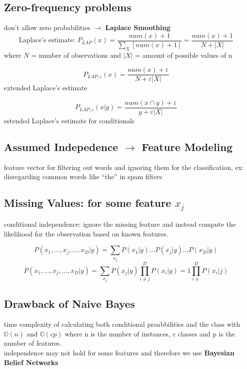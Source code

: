\documentclass{article}
\begin{document}
\subsection*{Zero-frequency problems}
don't allow zero probabilities $\rightarrow$ \textbf{Laplace Smoothing}
\\
\begin{equation}
    \text{Laplace's estimate: } P_{LAP}(x) = \frac{num(x) + 1}{\sum_{X}[num(x)+1]} = \frac{num(x) + 1}{N + |X|}
\end{equation}
where $N$ = number of observations and $|X|$ = amount of possible values of n

\begin{equation}
    P_{LAP, \varepsilon}(x) = \frac{num(x) + \varepsilon}{N + \varepsilon|X|}
\end{equation}
extended Laplace's estimate 

\begin{equation}
    P_{LAP, \varepsilon}(x | y) = \frac{num(x \cap y) + \varepsilon}{y + \varepsilon|X|}
\end{equation}
estended Laplace's estimate for conditionals

\subsection*{Assumed Indepedence $\rightarrow$ Feature Modeling}
feature vector for filtering out words and ignoring them for the classification, ex: disregarding common words like ``the'' in spam filters

\subsection*{Missing Values: for some feature $x_j$}
conditional independence: ignore the missing feature and instead compute the likelihood for the observation based on known features.

\begin{equation*}
    P(x_1, \dots, x_j, \dots, x_D | y) = \sum_{x_j} P(x_1 | y) \dots P(x_j | y) \dots P(x_D|y)
\end{equation*}
\begin{equation}
    P(x_1, \dots, x_j, \dots, x_D | y) = \sum_{x_j} P(x_j | y) \prod_{i\neq j}^{D} P(x_i | y) = 1 \prod_{i \neq}^{D} P(x_i|j)
\end{equation}

\subsection*{Drawback of Naive Bayes}
time complexity of calculating both conditional proabbilities and the class with $\mathbb{O}(n)$ and $\mathbb{O}(cp)$ where n is the number of instances, c classes and p is the number of features.
\\ 
independence may not hold for some features and therefore we use \textbf{Bayesian Belief Networks}
\end{document}
